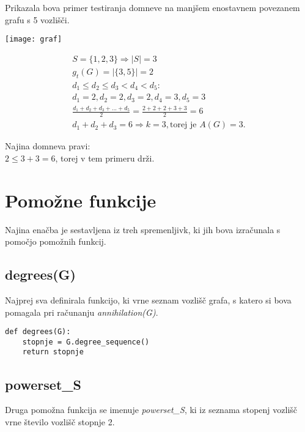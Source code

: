 \documentclass[11pt, a4paper]{article}
\begin{document}
Prikazala bova primer testiranja domneve na manjšem enostavnem povezanem grafu s 5 vozlišči.

\vspace{0,5cm}
\begin{center}
\texttt{[image: graf]}

\vspace{0,5cm}
\begin{gather*}
S = \{1, 2, 3\} \Rightarrow |S| = 3 \\
g_t(G) = |\{3, 5\}| = 2 \\
d_1 \leq d_2 \leq d_3 < d_4 < d_5: \\
d_1 = 2, d_2 = 2, d_3 = 2, d_4 = 3, d_5 = 3 \\
\frac{d_1 + d_2 + d_3 + ... + d_5}{2} = \frac{2+2+2+3+3}{2} = 6 \\
d_1 + d_2 + d_3 = 6 \Rightarrow k = 3, \text{torej je } A(G) = 3. 
\end{gather*}

\vspace{0.5cm}
Najina domneva pravi: \\
\vspace{0.5cm}
$2 \leq 3 + 3 = 6$, torej v tem primeru drži. \\
\end{center}

\section{\textbf{Pomožne funkcije}}
Najina enačba je sestavljena iz treh spremenljivk, ki jih bova izračunala s pomočjo pomožnih funkcij. 

\subsection{\textbf{degrees(G)}}
Najprej sva definirala funkcijo, ki vrne seznam vozlišč grafa, s katero si bova pomagala pri računanju \textit{annihilation(G)}.

\begin{verbatim}
def degrees(G):
    stopnje = G.degree_sequence()
    return stopnje
\end{verbatim}

\subsection{\textbf{powerset\_S}}
Druga pomožna funkcija se imenuje \textit{powerset\_S}, ki iz seznama stopenj vozlišč vrne število vozlišč stopnje 2.
\end{document}
